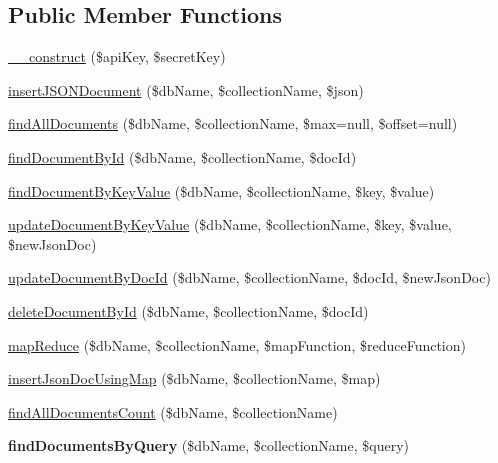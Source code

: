 \subsection*{Public Member Functions}
\begin{DoxyCompactItemize}
\item 
\hyperlink{class_storage_service_a49f2ad222e06420736d750e167d55d7c}{\+\_\+\+\_\+construct} (\$api\+Key, \$secret\+Key)
\item 
\hyperlink{class_storage_service_a56b0b73e5128872c3cc1ea5b701f082b}{insert\+J\+S\+O\+N\+Document} (\$db\+Name, \$collection\+Name, \$json)
\item 
\hyperlink{class_storage_service_a973209c01e5e068dae12eb1e4ee791c6}{find\+All\+Documents} (\$db\+Name, \$collection\+Name, \$max=null, \$offset=null)
\item 
\hyperlink{class_storage_service_ab106cf34e02fc0185d365e1ce22d7254}{find\+Document\+By\+Id} (\$db\+Name, \$collection\+Name, \$doc\+Id)
\item 
\hyperlink{class_storage_service_a83d76db91117a2e1dda2b0ff09cefa43}{find\+Document\+By\+Key\+Value} (\$db\+Name, \$collection\+Name, \$key, \$value)
\item 
\hyperlink{class_storage_service_a2a5605529ce0e045650a58f9fc691a25}{update\+Document\+By\+Key\+Value} (\$db\+Name, \$collection\+Name, \$key, \$value, \$new\+Json\+Doc)
\item 
\hyperlink{class_storage_service_af13827eeb888e031c9147dea3fef213e}{update\+Document\+By\+Doc\+Id} (\$db\+Name, \$collection\+Name, \$doc\+Id, \$new\+Json\+Doc)
\item 
\hyperlink{class_storage_service_abbf6f3d1aa976cd2fab02a37af34cb8c}{delete\+Document\+By\+Id} (\$db\+Name, \$collection\+Name, \$doc\+Id)
\item 
\hyperlink{class_storage_service_a2c95b1ca9754d616b3af34636f663c44}{map\+Reduce} (\$db\+Name, \$collection\+Name, \$map\+Function, \$reduce\+Function)
\item 
\hyperlink{class_storage_service_abb4ee11f0edbef6f4cf26006b5ab6f42}{insert\+Json\+Doc\+Using\+Map} (\$db\+Name, \$collection\+Name, \$map)
\item 
\hyperlink{class_storage_service_a44dec4d67d7350668d02b9974c264445}{find\+All\+Documents\+Count} (\$db\+Name, \$collection\+Name)
\item 
\hypertarget{class_storage_service_adda30f6e13d467fe582303964c532c67}{{\bfseries find\+Documents\+By\+Query} (\$db\+Name, \$collection\+Name, \$query)}\label{class_storage_service_adda30f6e13d467fe582303964c532c67}


\end{DoxyCompactItemize}
